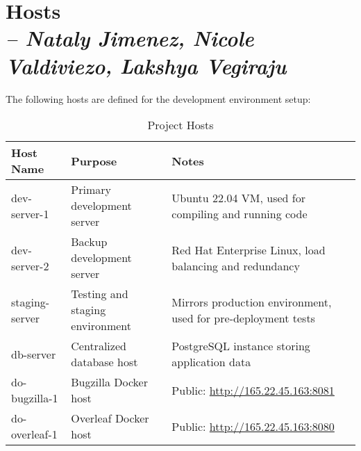 \chapter{Hosts \\
\small{\textit{-- Nataly Jimenez, Nicole Valdiviezo, Lakshya Vegiraju}}
\label{Chapter::Hosts}}

The following hosts are defined for the development environment setup:

\begin{longtable}{|p{4cm}|p{6cm}|p{6cm}|}
\caption{Project Hosts}\label{tab:hosts}\\
\hline
\textbf{Host Name} & \textbf{Purpose} & \textbf{Notes} \\
\hline
dev-server-1 & Primary development server & Ubuntu 22.04 VM, used for compiling and running code \\
\hline
dev-server-2 & Backup development server & Red Hat Enterprise Linux, load balancing and redundancy \\
\hline
staging-server & Testing and staging environment & Mirrors production environment, used for pre-deployment tests \\
\hline
db-server & Centralized database host & PostgreSQL instance storing application data \\
do-bugzilla-1 & Bugzilla Docker host & Public: \url{http://165.22.45.163:8081} \\
do-overleaf-1 & Overleaf Docker host & Public: \url{http://165.22.45.163:8080} \\
\hline
\end{longtable}
